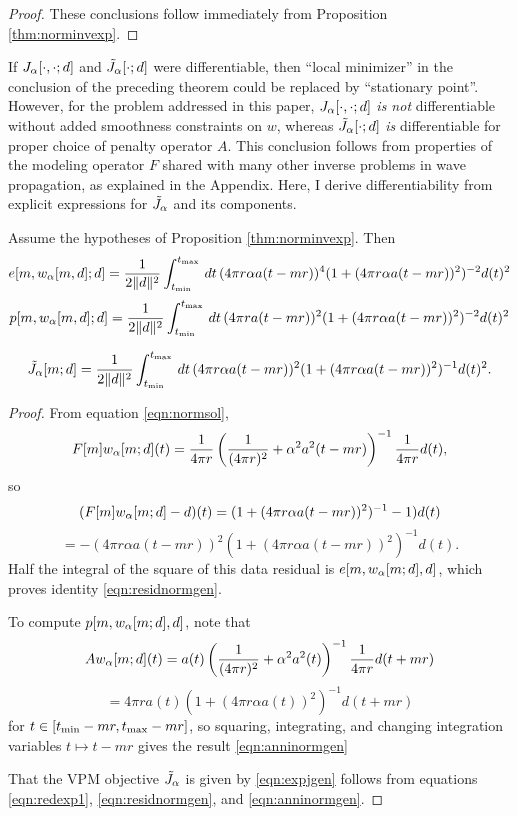 \begin{proof} These conclusions follow immediately from Proposition
  \ref{thm:norminvexp}.
\end{proof}

If $J_{\alpha}[\cdot,\cdot;d]$ and $\tilde{J}_{\alpha}[\cdot;d]$
were differentiable, then ``local minimizer'' in the conclusion of the
preceding theorem could be replaced by ``stationary point''. However,
for the problem addressed in this paper, $J_{\alpha}[\cdot,\cdot;d]$ {\em is
  not} differentiable without added smoothness constraints on $w$,
whereas $\tilde{J}_{\alpha}[\cdot;d]$ {\em is} differentiable for proper choice of
penalty operator $A$.
This conclusion follows from properties of the modeling operator $F$
shared with many other inverse problems in wave propagation, as
explained in the Appendix. Here, I derive differentiability from explicit
expressions for $\tilde{J}_{\alpha}$ and its components.

\begin{proposition}
  \label{thm:epjgen}
  Assume the hypotheses of Proposition \ref{thm:norminvexp}. Then
  \begin{equation}
  \label{eqn:residnormgen}
  e[m,w_{\alpha}[m,d];d] = \frac{1}{2\|d\|^2}\int_{t_{\rm min}}^{t_{\rm max}} \,dt\,(4\pi r \alpha a(t-mr))^4(1 +
  (4\pi r \alpha a(t-mr))^2)^{-2}d(t)^2
\end{equation}
\begin{equation}
  \label{eqn:anninormgen}
  p[m,w_{\alpha}[m,d];d] = \frac{1}{2\|d\|^2}\int_{t_{\rm min}}^{t_{\rm max}} \,dt\,(4\pi r a(t-mr))^2(1 +
  (4\pi r \alpha a(t-mr))^2)^{-2}d(t)^2
\end{equation}

\begin{equation}
  \label{eqn:expjgen}
\tilde{J}_{\alpha}[m;d] = \frac{1}{2\|d\|^2}\int_{t_{\rm min}}^{t_{\rm max}}\,dt\,(4\pi r \alpha a(t-mr))^2(1+(4\pi r \alpha 
a(t-mr))^2)^{-1}d(t)^2. 
\end{equation}
\end{proposition}

\begin{proof}
  From equation \ref{eqn:normsol},
  \[
    F[m]w_{\alpha}[m;d](t) = 
    \frac{1}{4 \pi r}\left(\frac{1}{(4\pi r)^2} + \alpha^2
      a^2(t-mr)\right)^{-1}\frac{1}{4 \pi r}d(t),
  \]
  so
  \[
    (F[m]w_{\alpha}[m;d]-d)(t) = (1 + (4 \pi r\alpha
    a(t-mr))^2)^{-1}-1)d(t)
  \]
  \[
    = -(4 \pi r\alpha a(t-mr))^2(1 + (4 \pi r\alpha
    a(t-mr))^2)^{-1}d(t).
  \]
  Half the integral of the square of this data residual is
  $e[m,w_{\alpha}[m;d],d]$, which proves identity \ref{eqn:residnormgen}.

  To compute $p[m,w_{\alpha}[m;d],d]$, note that
  \[
    Aw_{\alpha}[m;d](t)=a(t) \left(\frac{1}{(4\pi r)^2} + \alpha^2
      a^2(t)\right)^{-1}\frac{1}{4 \pi r}d(t+mr)
  \]
  \[
    = 4\pi r a(t) (1 + (4\pi r \alpha a(t))^2)^{-1}d(t+mr)
  \]
  for $ t \in [t_{\rm min}-mr, t_{\rm max}-mr]$, so squaring,
  integrating, and changing integration variables $t \mapsto t-mr$
  gives the result \ref{eqn:anninormgen}

  That the VPM objective $\tilde{J}_{\alpha}$ is given by \ref{eqn:expjgen} follows from equations \ref{eqn:redexp1}, \ref{eqn:residnormgen}, and
  \ref{eqn:anninormgen}.
\end{proof}

